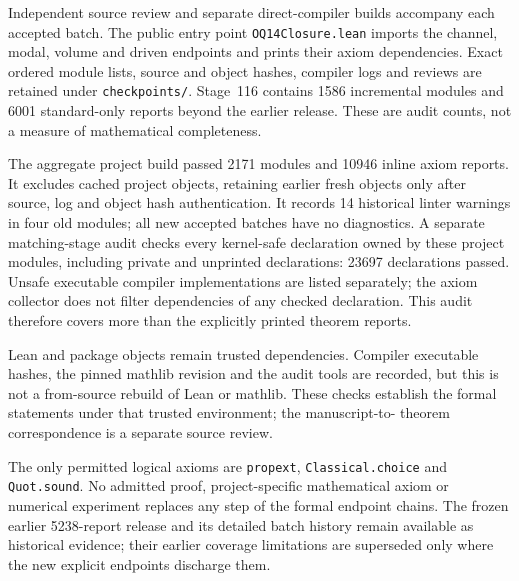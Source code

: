 Independent source review and separate direct-compiler builds accompany
each accepted batch. The public entry point \texttt{OQ14Closure.lean}
imports the channel, modal, volume and driven endpoints and prints their
axiom dependencies. Exact ordered module lists, source and object hashes,
compiler logs and reviews are retained under \texttt{checkpoints/}.
Stage~116 contains 1586 incremental modules and 6001 standard-only
reports beyond the earlier release. These are audit counts, not a measure
of mathematical completeness.

The aggregate project build passed 2171 modules and 10946 inline
axiom reports. It excludes cached project objects, retaining earlier fresh
objects only after source, log and object hash authentication. It records
14 historical linter warnings in four old modules; all new accepted
batches have no diagnostics. A separate matching-stage audit checks every
kernel-safe declaration owned by these project modules, including private
and unprinted declarations: 23697 declarations passed. Unsafe executable
compiler implementations are listed separately; the axiom collector does
not filter dependencies of any checked declaration. This audit therefore
covers more than the explicitly printed theorem reports.

Lean and package objects remain trusted dependencies. Compiler executable
hashes, the pinned mathlib revision and the audit tools are recorded, but
this is not a from-source rebuild of Lean or mathlib. These checks establish
the formal statements under that trusted environment; the manuscript-to-
theorem correspondence is a separate source review.

The only permitted logical axioms are \texttt{propext},
\texttt{Classical.choice} and \texttt{Quot.sound}.  No admitted proof,
project-specific mathematical axiom or numerical experiment replaces
any step of the formal endpoint chains.  The frozen earlier 5238-report
release and its detailed batch history remain available as historical
evidence; their earlier coverage limitations are superseded only where
the new explicit endpoints discharge them.

